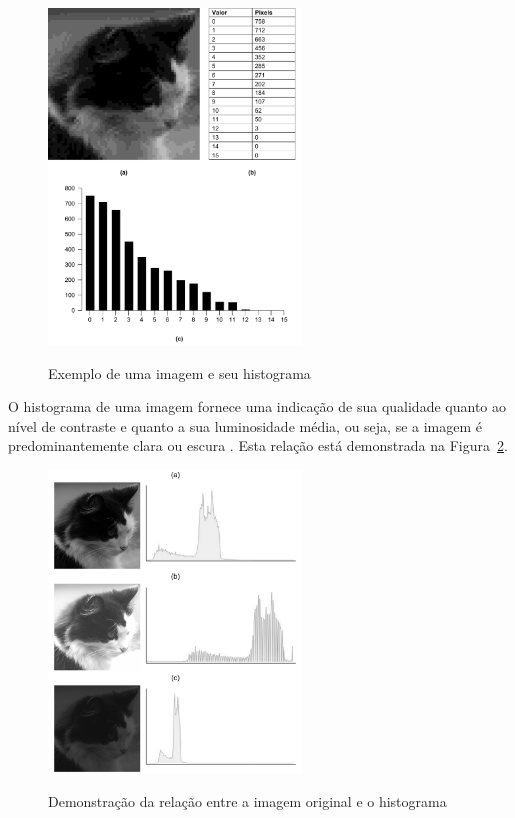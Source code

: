 \documentclass[12pt,oneside,a4paper,english,french,spanish,brazil,]{abntex2}
\begin{document}
\begin{figure}[ht]
\centering
\caption{Exemplo de uma imagem e seu histograma}
\includegraphics[width=0.6\textwidth]{imagens/PDI_Histograma.pdf}
\sourceAuthor
\label{fig:PDI_Histograma}
\end{figure}

O histograma de uma imagem fornece uma indicação de sua qualidade quanto ao nível de contraste e quanto a sua luminosidade média, ou seja, se a imagem é predominantemente clara ou escura \cite{conci:2003}. Esta relação está demonstrada na Figura~\ref{fig:PDI_Histograma_2}.

\begin{figure}[ht]
\centering
\caption{Demonstração da relação entre a imagem original e o histograma}
\includegraphics[width=0.6\textwidth]{imagens/PDI_Histograma_2.pdf}
\sourceAuthor
\label{fig:PDI_Histograma_2}
\end{figure}
\end{document}
